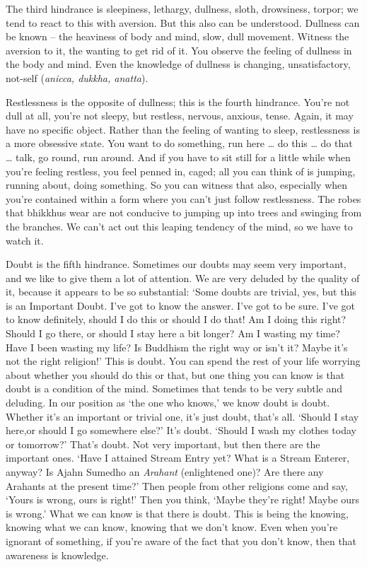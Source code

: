 The third hindrance is sleepiness, lethargy, dullness, sloth, drowsiness, torpor; we tend to react to this with aversion. But this also can be understood. Dullness can be known -- the heaviness of body and mind, slow, dull movement. Witness the aversion to it, the wanting to get rid of it. You observe the feeling of dullness in the body and mind. Even the knowledge of dullness is changing, unsatisfactory, not-self (\textit{anicca, dukkha, anatta}).

Restlessness is the opposite of dullness; this is the fourth hindrance. You're not dull at all, you're not sleepy, but restless, nervous, anxious, tense. Again, it may have no specific object. Rather than the feeling of wanting to sleep, restlessness is a more obsessive state. You want to do something, run here \ldots{} do this \ldots{} do that \ldots{} talk, go round, run around. And if you have to sit still for a little while when you're feeling restless, you feel penned in, caged; all you can think of is jumping, running about, doing something. So you can witness that also, especially when you're contained within a form where you can't just follow restlessness. The robes that bhikkhus wear are not conducive to jumping up into trees and swinging from the branches. We can't act out this leaping tendency of the mind, so we have to watch it.

Doubt is the fifth hindrance. Sometimes our doubts may seem very important, and we like to give them a lot of attention. We are very deluded by the quality of it, because it appears to be so substantial: `Some doubts are trivial, yes, but this is an Important Doubt. I've got to know the answer. I've got to be sure. I've got to know definitely, should I do this or should I do that! Am I doing this right? Should I go there, or should I stay here a bit longer? Am I wasting my time? Have I been wasting my life? Is Buddhism the right way or isn't it? Maybe it's not the right religion!' This is doubt. You can spend the rest of your life worrying about whether you should do this or that, but one thing you can know is that doubt is a condition of the mind. Sometimes that tends to be very subtle and deluding. In our position as `the one who knows,' we know doubt is doubt. Whether it's an important or trivial one, it's just doubt, that's all. `Should I stay here,or should I go somewhere else?' It's doubt. `Should I wash my clothes today or tomorrow?' That's doubt. Not very important, but then there are the important ones. `Have I attained Stream Entry yet? What is a Stream Enterer, anyway? Is Ajahn Sumedho an \textit{Arahant} (enlightened one)? Are there any Arahants at the present time?' Then people from other religions come and say, `Yours is wrong, ours is right!' Then you think, `Maybe they're right! Maybe ours is wrong.' What we can know is that there is doubt. This is being the knowing, knowing what we can know, knowing that we don't know. Even when you're ignorant of something, if you're aware of the fact that you don't know, then that awareness is knowledge.

